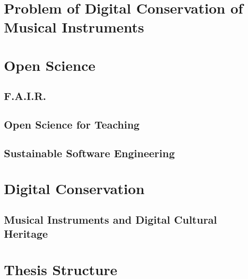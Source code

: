 \section{Problem of Digital Conservation of Musical Instruments}
\section{Open Science}
\subsection{F.A.I.R.}
\subsection{Open Science for Teaching}
\subsection{Sustainable Software Engineering}
\section{Digital Conservation}
\subsection{Musical Instruments and Digital Cultural Heritage}
\section{Thesis Structure}
